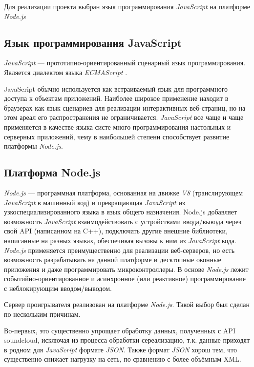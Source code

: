Для реализации проекта выбран язык программирования \textit{JavaScript} на
платформе \textit{Node.js}

\subsection{Язык программирования JavaScript}

\textit{JavaScript} \cite{wiki:js} --- прототипно-ориентированный сценарный язык
программирования. Является диалектом языка \textit{ECMAScript} \cite{wiki:ecma}.

JavaScript обычно используется как встраиваемый язык для программного
доступа к объектам приложений. Наиболее широкое применение находит в
браузерах как язык сценариев для реализации интерактивных веб-страниц,
но на этом ареал его распространения не ограничивается. \textit{JavaScript} все
чаще и чаще применяется в качестве языка систе много программирования
настольных и серверных приложений, чему в наибольшей степени
способствует развитие платформы\textit{ Node.js}.

\subsection{Платформа Node.js}

\textit{Node.js} \cite{wiki:nodejs} --- программная платформа, основанная на
движке \textit{V8} \cite{wiki:v8}
(транслирующем \textit{JavaScript} в машинный код) и превращающая \textit{ JavaScript} из
узкоспециализированного языка в язык общего назначения. Node.js
добавляет возможность \textit{JavaScript} взаимодействовать с устройствами
ввода/вывода через свой API (написанном на C++), подключать другие
внешние библиотеки, написанные на разных языках, обеспечивая вызовы к
ним из \textit{JavaScript} кода.
\textit{Node.js} применяется преимущественно для
реализации веб-серверов, но есть возможность разрабатывать на данной платформе и
десктопные оконные приложения и даже программировать
микроконтроллеры. В основе \textit{Node.js} лежит
событийно-ориентированное и асинхронное (или реактивное)
программирование с неблокирующим вводом/выводом.

Сервер проигрывателя реализован на платформе \textit{Node.js}. Такой выбор был
сделан по нескольким причинам.

Во-первых, это существенно упрощает обработку данных, полученных с API
soundcloud, исключая из процесса обработки сереализацию,
т.к. данные приходят в родном для \textit{JavaScript} формате \textit{JSON}. Также формат \textit{JSON}
хорош тем, что существенно снижает нагрузку на сеть, по сравнению с
более объёмным XML.

